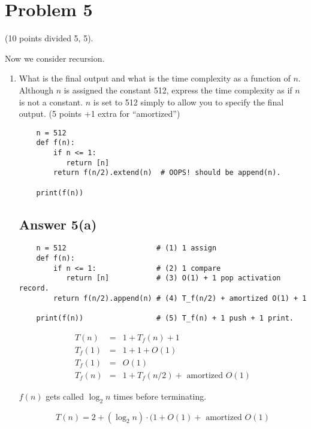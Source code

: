 \documentclass{article}
\begin{document}
\section{Problem 5}

(10 points divided 5, 5).

Now we consider recursion.

\begin{enumerate}[label=(\alph*)]
\item  What is the final output and what is the time complexity as a
  function of $n$. Although $n$ is assigned the constant 512, express
  the time complexity as if $n$ is not a constant.  $n$ is set to 512
  simply to allow you to specify the final output. (5 points +1 extra for ``amortized'')
  
\begin{verbatim}
    n = 512
    def f(n):
        if n <= 1:
           return [n]
        return f(n/2).extend(n)  # OOPS! should be append(n).  

    print(f(n))
\end{verbatim}

\subsection*{Answer 5(a)}

\begin{verbatim}
    n = 512                     # (1) 1 assign
    def f(n):          
        if n <= 1:              # (2) 1 compare
           return [n]           # (3) O(1) + 1 pop activation record.
        return f(n/2).append(n) # (4) T_f(n/2) + amortized O(1) + 1 

    print(f(n))                 # (5) T_f(n) + 1 push + 1 print.
\end{verbatim}


\begin{eqnarray*}
  T(n) &=& 1 + T_f(n) + 1 \\
  T_f(1) &=& 1 + 1 + O(1) \\
  T_f(1) &=& O(1) \\
  T_f(n) &=& 1 + T_f(n/2) + \text{ amortized } O(1) 
\end{eqnarray*}

$f(n)$ gets called $\log_2 n$ times before terminating.

\begin{equation*}
  T(n) = 2 + (\log_2 n) \cdot (1 + O(1) + \text{ amortized } O(1)
\end{equation*}


\end{enumerate}
\end{document}
